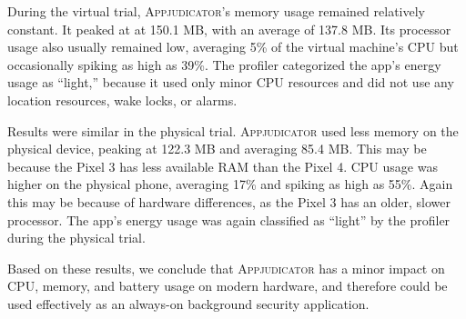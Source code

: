 During the virtual trial, \textsc{Appjudicator}'s memory usage remained
relatively constant. It peaked at at 150.1 MB, with an average of 137.8 MB. Its
processor usage also usually remained low, averaging 5\% of the virtual
machine's CPU but occasionally spiking as high as 39\%. The profiler categorized
the app's energy usage as ``light,'' because it used only minor CPU resources
and did not use any location resources, wake locks, or alarms.

Results were similar in the physical trial. \textsc{Appjudicator} used less
memory on the physical device, peaking at 122.3 MB and averaging 85.4 MB. This
may be because the Pixel 3 has less available RAM than the Pixel 4. CPU usage
was higher on the physical phone, averaging 17\% and spiking as high as 55\%.
Again this may be because of hardware differences, as the Pixel 3 has an older,
slower processor. The app's energy usage was again classified as ``light'' by
the profiler during the physical trial. 

Based on these results, we conclude that \textsc{Appjudicator} has a minor
impact on CPU, memory, and battery usage on modern hardware, and therefore could
be used effectively as an always-on background security application.

\newpage

